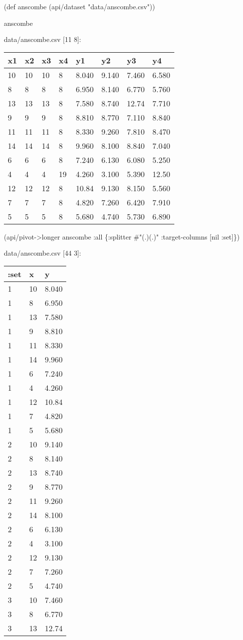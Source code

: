 \documentclass[]{article}
\newenvironment{Shaded}{\begin{snugshade}}{\end{snugshade}}
\newcommand{\StringTok}[1]{\textcolor[rgb]{0.31,0.60,0.02}{#1}}
\newcommand{\SpecialStringTok}[1]{\textcolor[rgb]{0.31,0.60,0.02}{#1}}
\newcommand{\FunctionTok}[1]{\textcolor[rgb]{0.00,0.00,0.00}{#1}}
\newcommand{\VariableTok}[1]{\textcolor[rgb]{0.00,0.00,0.00}{#1}}
\newcommand{\BuiltInTok}[1]{#1}
\newcommand{\AttributeTok}[1]{\textcolor[rgb]{0.77,0.63,0.00}{#1}}
\newcommand{\NormalTok}[1]{#1}
\begin{document}
\begin{Shaded}
\begin{Highlighting}[]
\NormalTok{(}\BuiltInTok{def}\FunctionTok{ anscombe }\NormalTok{(api/dataset }\StringTok{"data/anscombe.csv"}\NormalTok{))}
\end{Highlighting}
\end{Shaded}

\begin{Shaded}
\begin{Highlighting}[]
\NormalTok{anscombe}
\end{Highlighting}
\end{Shaded}

data/anscombe.csv {[}11 8{]}:

\begin{longtable}[]{@{}llllllll@{}}
\toprule
x1 & x2 & x3 & x4 & y1 & y2 & y3 & y4\tabularnewline
\midrule
\endhead
10 & 10 & 10 & 8 & 8.040 & 9.140 & 7.460 & 6.580\tabularnewline
8 & 8 & 8 & 8 & 6.950 & 8.140 & 6.770 & 5.760\tabularnewline
13 & 13 & 13 & 8 & 7.580 & 8.740 & 12.74 & 7.710\tabularnewline
9 & 9 & 9 & 8 & 8.810 & 8.770 & 7.110 & 8.840\tabularnewline
11 & 11 & 11 & 8 & 8.330 & 9.260 & 7.810 & 8.470\tabularnewline
14 & 14 & 14 & 8 & 9.960 & 8.100 & 8.840 & 7.040\tabularnewline
6 & 6 & 6 & 8 & 7.240 & 6.130 & 6.080 & 5.250\tabularnewline
4 & 4 & 4 & 19 & 4.260 & 3.100 & 5.390 & 12.50\tabularnewline
12 & 12 & 12 & 8 & 10.84 & 9.130 & 8.150 & 5.560\tabularnewline
7 & 7 & 7 & 8 & 4.820 & 7.260 & 6.420 & 7.910\tabularnewline
5 & 5 & 5 & 8 & 5.680 & 4.740 & 5.730 & 6.890\tabularnewline
\bottomrule
\end{longtable}

\begin{Shaded}
\begin{Highlighting}[]
\NormalTok{(api/pivot->longer anscombe }\AttributeTok{:all}\NormalTok{ \{}\AttributeTok{:splitter} \SpecialStringTok{#"(.)(.)"}
                                  \AttributeTok{:target-columns}\NormalTok{ [}\VariableTok{nil} \AttributeTok{:set}\NormalTok{]\})}
\end{Highlighting}
\end{Shaded}

data/anscombe.csv {[}44 3{]}:

\begin{longtable}[]{@{}lll@{}}
\toprule
:set & x & y\tabularnewline
\midrule
\endhead
1 & 10 & 8.040\tabularnewline
1 & 8 & 6.950\tabularnewline
1 & 13 & 7.580\tabularnewline
1 & 9 & 8.810\tabularnewline
1 & 11 & 8.330\tabularnewline
1 & 14 & 9.960\tabularnewline
1 & 6 & 7.240\tabularnewline
1 & 4 & 4.260\tabularnewline
1 & 12 & 10.84\tabularnewline
1 & 7 & 4.820\tabularnewline
1 & 5 & 5.680\tabularnewline
2 & 10 & 9.140\tabularnewline
2 & 8 & 8.140\tabularnewline
2 & 13 & 8.740\tabularnewline
2 & 9 & 8.770\tabularnewline
2 & 11 & 9.260\tabularnewline
2 & 14 & 8.100\tabularnewline
2 & 6 & 6.130\tabularnewline
2 & 4 & 3.100\tabularnewline
2 & 12 & 9.130\tabularnewline
2 & 7 & 7.260\tabularnewline
2 & 5 & 4.740\tabularnewline
3 & 10 & 7.460\tabularnewline
3 & 8 & 6.770\tabularnewline
3 & 13 & 12.74\tabularnewline
\bottomrule
\end{longtable}
\end{document}
